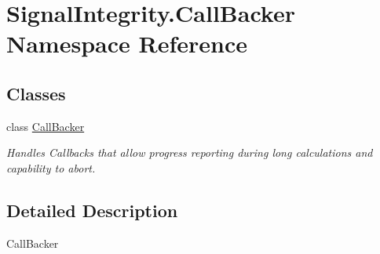 \hypertarget{namespaceSignalIntegrity_1_1CallBacker}{}\section{Signal\+Integrity.\+Call\+Backer Namespace Reference}
\label{namespaceSignalIntegrity_1_1CallBacker}
\subsection*{Classes}
\begin{DoxyCompactItemize}
\item 
class \hyperlink{classSignalIntegrity_1_1CallBacker_1_1CallBacker}{Call\+Backer}
\begin{DoxyCompactList}\small\item\em Handles Callbacks that allow progress reporting during long calculations and capability to abort. \end{DoxyCompactList}\end{DoxyCompactItemize}


\subsection{Detailed Description}
\begin{DoxyVerb}CallBacker\end{DoxyVerb}
 